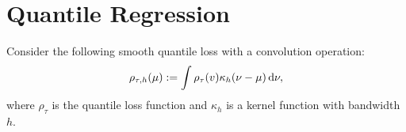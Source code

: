 \chapter{Quantile Regression}

\begin{definition}
	Consider the following smooth quantile loss with a convolution operation:
	\begin{equation}
		\label{eq:smooth-quantile-loss}
		\rho_{\tau,h}(\mu):=\int\rho_{\tau}(v)\kappa_{h}(\nu-\mu)\mathop{}\!\mathrm{d}\nu,
	\end{equation}
	where \(\rho_{\tau}\) is the quantile loss function and \(\kappa_{h}\) is a kernel function with bandwidth \(h\).
\end{definition}

